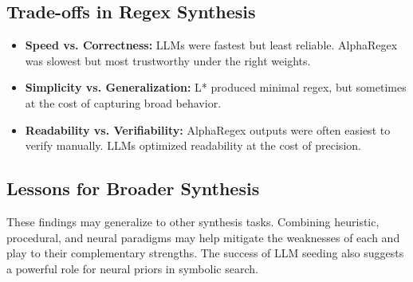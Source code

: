 \subsection{Trade-offs in Regex Synthesis}

\begin{itemize}
\item \textbf{Speed vs. Correctness:} LLMs were fastest but least reliable. AlphaRegex was slowest but most trustworthy under the right weights.
\item \textbf{Simplicity vs. Generalization:} L* produced minimal regex, but sometimes at the cost of capturing broad behavior.
\item \textbf{Readability vs. Verifiability:} AlphaRegex outputs were often easiest to verify manually. LLMs optimized readability at the cost of precision.
\end{itemize}

\subsection{Lessons for Broader Synthesis}

\indent\indent These findings may generalize to other synthesis tasks. Combining heuristic, procedural, and neural paradigms may help mitigate the weaknesses of each and play to their complementary strengths. The success of LLM seeding also suggests a powerful role for neural priors in symbolic search.

\vspace{2em}

